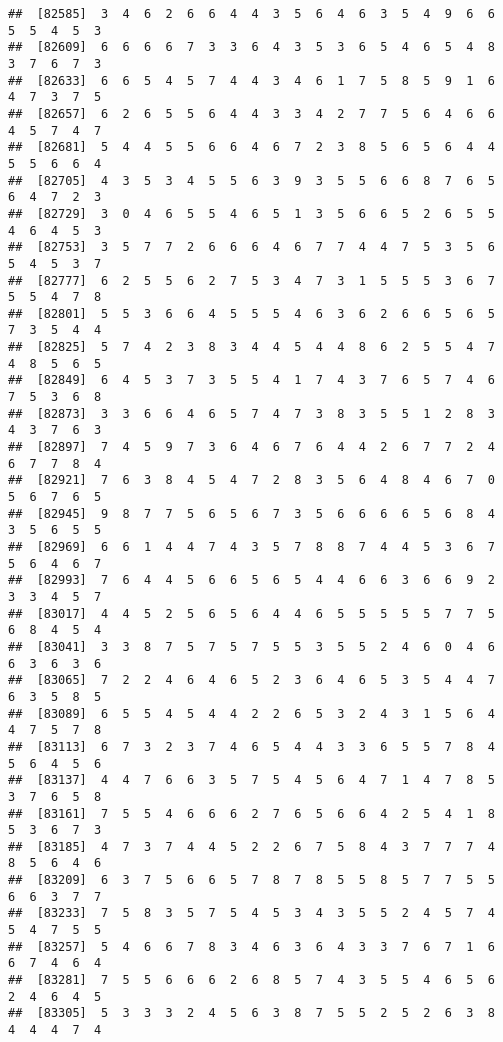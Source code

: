 \documentclass[
]{book}
\begin{document}
\begin{verbatim}
##  [82585]  3  4  6  2  6  6  4  4  3  5  6  4  6  3  5  4  9  6  6  5  5  4  5  3
##  [82609]  6  6  6  6  7  3  3  6  4  3  5  3  6  5  4  6  5  4  8  3  7  6  7  3
##  [82633]  6  6  5  4  5  7  4  4  3  4  6  1  7  5  8  5  9  1  6  4  7  3  7  5
##  [82657]  6  2  6  5  5  6  4  4  3  3  4  2  7  7  5  6  4  6  6  4  5  7  4  7
##  [82681]  5  4  4  5  5  6  6  4  6  7  2  3  8  5  6  5  6  4  4  5  5  6  6  4
##  [82705]  4  3  5  3  4  5  5  6  3  9  3  5  5  6  6  8  7  6  5  6  4  7  2  3
##  [82729]  3  0  4  6  5  5  4  6  5  1  3  5  6  6  5  2  6  5  5  4  6  4  5  3
##  [82753]  3  5  7  7  2  6  6  6  4  6  7  7  4  4  7  5  3  5  6  5  4  5  3  7
##  [82777]  6  2  5  5  6  2  7  5  3  4  7  3  1  5  5  5  3  6  7  5  5  4  7  8
##  [82801]  5  5  3  6  6  4  5  5  5  4  6  3  6  2  6  6  5  6  5  7  3  5  4  4
##  [82825]  5  7  4  2  3  8  3  4  4  5  4  4  8  6  2  5  5  4  7  4  8  5  6  5
##  [82849]  6  4  5  3  7  3  5  5  4  1  7  4  3  7  6  5  7  4  6  7  5  3  6  8
##  [82873]  3  3  6  6  4  6  5  7  4  7  3  8  3  5  5  1  2  8  3  4  3  7  6  3
##  [82897]  7  4  5  9  7  3  6  4  6  7  6  4  4  2  6  7  7  2  4  6  7  7  8  4
##  [82921]  7  6  3  8  4  5  4  7  2  8  3  5  6  4  8  4  6  7  0  5  6  7  6  5
##  [82945]  9  8  7  7  5  6  5  6  7  3  5  6  6  6  6  5  6  8  4  3  5  6  5  5
##  [82969]  6  6  1  4  4  7  4  3  5  7  8  8  7  4  4  5  3  6  7  5  6  4  6  7
##  [82993]  7  6  4  4  5  6  6  5  6  5  4  4  6  6  3  6  6  9  2  3  3  4  5  7
##  [83017]  4  4  5  2  5  6  5  6  4  4  6  5  5  5  5  5  7  7  5  6  8  4  5  4
##  [83041]  3  3  8  7  5  7  5  7  5  5  3  5  5  2  4  6  0  4  6  6  3  6  3  6
##  [83065]  7  2  2  4  6  4  6  5  2  3  6  4  6  5  3  5  4  4  7  6  3  5  8  5
##  [83089]  6  5  5  4  5  4  4  2  2  6  5  3  2  4  3  1  5  6  4  4  7  5  7  8
##  [83113]  6  7  3  2  3  7  4  6  5  4  4  3  3  6  5  5  7  8  4  5  6  4  5  6
##  [83137]  4  4  7  6  6  3  5  7  5  4  5  6  4  7  1  4  7  8  5  3  7  6  5  8
##  [83161]  7  5  5  4  6  6  6  2  7  6  5  6  6  4  2  5  4  1  8  5  3  6  7  3
##  [83185]  4  7  3  7  4  4  5  2  2  6  7  5  8  4  3  7  7  7  4  8  5  6  4  6
##  [83209]  6  3  7  5  6  6  5  7  8  7  8  5  5  8  5  7  7  5  5  6  6  3  7  7
##  [83233]  7  5  8  3  5  7  5  4  5  3  4  3  5  5  2  4  5  7  4  5  4  7  5  5
##  [83257]  5  4  6  6  7  8  3  4  6  3  6  4  3  3  7  6  7  1  6  6  7  4  6  4
##  [83281]  7  5  5  6  6  6  2  6  8  5  7  4  3  5  5  4  6  5  6  2  4  6  4  5
##  [83305]  5  3  3  3  2  4  5  6  3  8  7  5  5  2  5  2  6  3  8  4  4  4  7  4

\end{verbatim}
\end{document}

